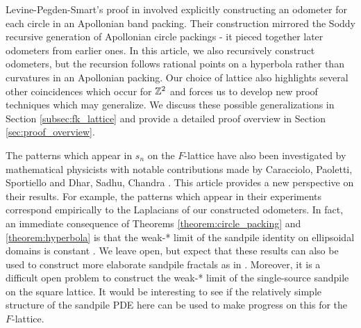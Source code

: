 \documentclass[12pt]{amsart}
\begin{document}
	Levine-Pegden-Smart's proof in \cite{levine2017apollonian} involved explicitly constructing an odometer
	for each circle in an Apollonian band packing.  Their construction mirrored the Soddy recursive generation 
	of Apollonian circle packings - it pieced together later odometers from earlier ones. In this article, we also recursively construct
	odometers, but the recursion follows rational points on a hyperbola rather than curvatures in an Apollonian packing.
	Our choice of lattice also highlights several other coincidences which occur for $\mathbb{Z}^2$ and forces us to develop 
	 new proof techniques which may generalize.  We discuss these possible generalizations in Section \ref{subsec:fk_lattice}  and provide a detailed proof overview in Section \ref{sec:proof_overview}.
		



	
	The patterns which appear in $s_n$ on the $F$-lattice have also been investigated by mathematical physicists
	with notable contributions made by Caracciolo, Paoletti, Sportiello \cite{caracciolo2008explicit, paoletti2012deterministic} and Dhar, Sadhu, Chandra \cite{dhar2009pattern, dhar2013sandpile, sadhu2010pattern, sadhu2011effect}. This article provides a new perspective on their results. For example, the patterns which appear in their experiments correspond empirically to the Laplacians of our constructed odometers. In fact, an immediate consequence of Theorems \ref{theorem:circle_packing} and \ref{theorem:hyperbola} is that the weak-* limit 
	of the sandpile identity on ellipsoidal domains is constant \cite{melchionna2020sandpile}. We leave open, but expect that these results can also be used to construct more elaborate sandpile fractals as in \cite{levine2016apollonian}. Moreover, it is a difficult open problem 
	to construct the weak-* limit of the single-source sandpile on the square lattice. It would be interesting to see if the relatively simple structure of the sandpile PDE here can be used to make progress on this for the $F$-lattice.
	 
\end{document}
